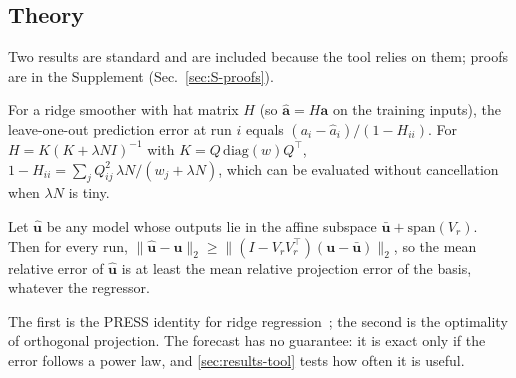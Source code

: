 \subsection{Theory}
Two results are standard and are included because the tool relies on them; proofs are in the Supplement (Sec.~\ref{sec:S-proofs}).
\begin{proposition}\label{prop:loo}
For a ridge smoother with hat matrix $H$ (so $\hat{\mathbf a}=H\mathbf a$ on the training inputs), the leave-one-out prediction error at run $i$ equals $(a_i-\hat a_i)/(1-H_{ii})$. For $H=K(K+\lambda N I)^{-1}$ with $K=Q\,\mathrm{diag}(w)Q^\top$, $1-H_{ii}=\sum_j Q_{ij}^2\,\lambda N/(w_j+\lambda N)$, which can be evaluated without cancellation when $\lambda N$ is tiny.
\end{proposition}
\begin{proposition}\label{prop:floor}
Let $\hat{\mathbf u}$ be any model whose outputs lie in the affine subspace $\bar{\mathbf u}+\mathrm{span}(V_r)$. Then for every run, $\lVert\hat{\mathbf u}-\mathbf u\rVert_2\ge\lVert(I-V_rV_r^\top)(\mathbf u-\bar{\mathbf u})\rVert_2$, so the mean relative error of $\hat{\mathbf u}$ is at least the mean relative projection error of the basis, whatever the regressor.
\end{proposition}
The first is the PRESS identity for ridge regression~\cite{golub1979}; the second is the optimality of orthogonal projection. The forecast has no guarantee: it is exact only if the error follows a power law, and \cref{sec:results-tool} tests how often it is useful.
